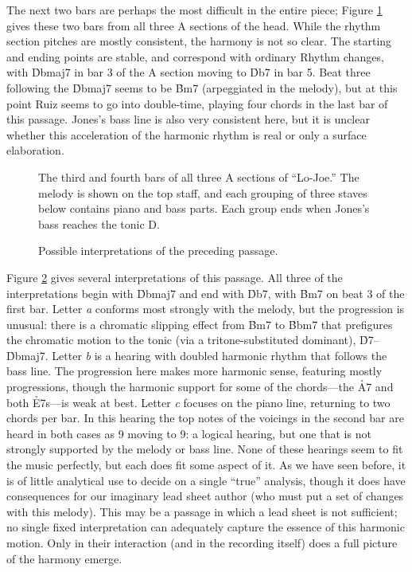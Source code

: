 The next two bars are perhaps the most difficult in the entire piece; Figure
\ref{lj:a-third-fourth} gives these two bars from all three A sections of the
head. While the rhythm section pitches are mostly consistent, the harmony is
not so clear. The starting and ending points are stable, and correspond with
ordinary Rhythm changes, with \h{Dbmaj7} in bar 3 of the A section moving to
\h{Db7} in bar 5. Beat three following the \h{Dbmaj7} seems to be \h{Bm7}
(arpeggiated in the melody), but at this point Ruiz seems to go into
double-time, playing four chords in the last bar of this passage. Jones's bass
line is also very consistent here, but it is unclear whether this acceleration
of the harmonic rhythm is real or only a surface elaboration.

\begin{figure}[tbp]
  \caption[The third and fourth bars of all three A sections of ``Lo-Joe.'']{%
    The third and fourth bars of all three A sections of ``Lo-Joe.'' The
    melody is shown on the top staff, and each grouping of three staves below
    contains piano and bass parts. Each group ends when Jones's bass reaches
    the tonic D\protect\flat.}
  \label{lj:a-third-fourth}
\end{figure}

\begin{figure}[tbp]
  \caption[Possible interpretations of the third and fourth bars of the A
  sections.]{%
    Possible interpretations of the preceding passage.}
  \label{lj:third-fourth-analyses}
\end{figure}

Figure \ref{lj:third-fourth-analyses} gives several interpretations of this
passage. All three of the interpretations begin with \h{Dbmaj7} and end with
\h{Db7}, with \h{Bm7} on beat 3 of the first bar. Letter \emph{a} conforms
most strongly with the melody, but the progression is unusual: there is a
chromatic slipping effect from \h{Bm7} to \h{Bbm7} that prefigures the
chromatic motion to the tonic (via a tritone-substituted dominant),
\h{D7}--\h{Dbmaj7}. Letter \emph{b} is a hearing with doubled harmonic rhythm
that follows the bass line. The progression here makes more harmonic sense,
featuring mostly \tf progressions, though the harmonic support for some of the
chords---the \h{A7} and both \h{E7}s---is weak at best. Letter \emph{c}
focuses on the piano line, returning to two chords per bar. In this hearing
the top notes of the voicings in the second bar are heard in both cases as
\sharp{}9 moving to \flat{}9: a logical hearing, but one that is not strongly
supported by the melody or bass line. None of these hearings seem to fit the
music perfectly, but each does fit some aspect of it. As we have seen before,
it is of little analytical use to decide on a single ``true'' analysis, though
it does have consequences for our imaginary lead sheet author (who must put a
set of changes with this melody). This may be a passage in which a lead sheet
is not sufficient; no single fixed interpretation can adequately capture the
essence of this harmonic motion. Only in their interaction (and in the
recording itself) does a full picture of the harmony emerge.


